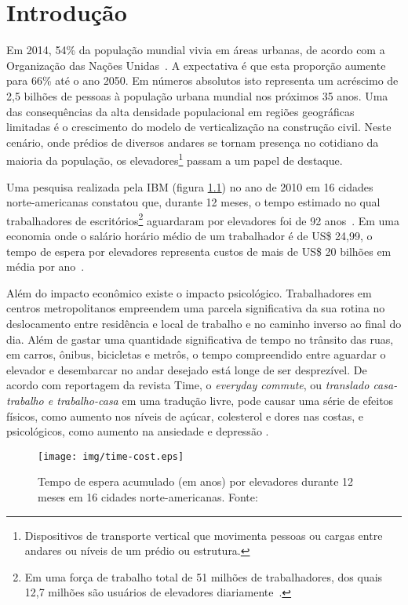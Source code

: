 \chapter{\label{chap:intro}Introdução}


Em 2014, 54\% da população mundial vivia em áreas urbanas, de acordo com a
Organização das Nações Unidas~\cite{UN14}. A expectativa é que esta proporção
aumente para 66\% até o ano 2050. Em números absolutos isto representa um
acréscimo de 2,5 bilhões de pessoas à população urbana mundial nos próximos 35
anos. Uma das consequências da alta densidade populacional em regiões
geográficas limitadas é o crescimento do modelo de verticalização na construção
civil. Neste cenário, onde prédios de diversos andares se tornam presença no
cotidiano da maioria da população, os elevadores\footnote{Dispositivos de
transporte vertical que movimenta pessoas ou cargas entre andares ou níveis de
um prédio ou estrutura.} passam a um papel de destaque.

Uma pesquisa realizada pela IBM (figura \ref{fig:timecost}) no ano de 2010 em 16
cidades norte-americanas constatou que, durante 12 meses, o tempo estimado no
qual trabalhadores de escritórios\footnote{Em uma força de trabalho total de 51
milhões de trabalhadores, dos quais 12,7 milhões são usuários de elevadores
diariamente~\cite{IBM10}.} aguardaram por elevadores foi de 92
anos~\cite{IBM10}. Em uma economia onde o salário horário médio de um
trabalhador é de US\$ 24,99, o tempo de espera por elevadores representa custos
de mais de US\$ 20 bilhões em média por ano~\cite{BLS15}.

Além do impacto econômico existe o impacto psicológico. Trabalhadores em centros
metropolitanos empreendem uma parcela significativa da sua rotina no
deslocamento entre residência e local de trabalho e no caminho inverso ao final
do dia. Além de gastar uma quantidade significativa de tempo no trânsito das
ruas, em carros, ônibus, bicicletas e metrôs, o tempo compreendido entre
aguardar o elevador e desembarcar no andar desejado está longe de ser
desprezível. De acordo com reportagem da revista Time, o \textit{everyday
commute}, ou \textit{translado casa-trabalho e trabalho-casa} em uma tradução
livre, pode causar uma série de efeitos físicos, como aumento nos níveis de
açúcar, colesterol e dores nas costas, e psicológicos, como aumento na ansiedade
e depressão \cite{Kylstra14}.

\begin{figure}[htb!]
\centering\texttt{[image: img/time-cost.eps]}
\caption[Tempo de espera acumulado (em anos).]{\label{fig:timecost}Tempo de espera acumulado (em anos) por elevadores
durante 12 meses em 16 cidades norte-americanas. Fonte:~\cite{IBM10}}
\end{figure}

